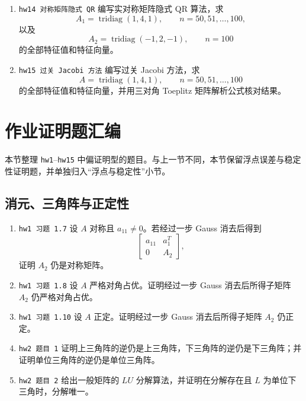 \documentclass{article}
\newcommand{\tridiag}{\operatorname{tridiag}}
\begin{document}
\begin{enumerate}
  \item \texttt{hw14 对称矩阵隐式 QR} 编写实对称矩阵隐式 QR 算法，求
  \[
    A_1=\tridiag(1,4,1),\qquad n=50,51,\ldots,100,
  \]
  以及
  \[
    A_2=\tridiag(-1,2,-1),\qquad n=100
  \]
  的全部特征值和特征向量。

  \item \texttt{hw15 过关 Jacobi 方法} 编写过关 Jacobi 方法，求
  \[
    A=\tridiag(1,4,1),\qquad n=50,51,\ldots,100
  \]
  的全部特征值和特征向量，并用三对角 Toeplitz 矩阵解析公式核对结果。
\end{enumerate}

\section{作业证明题汇编}

\noindent 本节整理 \texttt{hw1}--\texttt{hw15} 中偏证明型的题目。与上一节不同，本节保留浮点误差与稳定性证明题，并单独归入“浮点与稳定性”小节。

\subsection{消元、三角阵与正定性}

\begin{enumerate}
  \item \texttt{hw1 习题 1.7} 设 $A$ 对称且 $a_{11}\ne0$。若经过一步 Gauss 消去后得到
  \[
    \begin{bmatrix}
      a_{11}&a_1^T\\
      0&A_2
    \end{bmatrix},
  \]
  证明 $A_2$ 仍是对称矩阵。

  \item \texttt{hw1 习题 1.8} 设 $A$ 严格对角占优。证明经过一步 Gauss 消去后所得子矩阵 $A_2$ 仍严格对角占优。

  \item \texttt{hw1 习题 1.10} 设 $A$ 正定。证明经过一步 Gauss 消去后所得子矩阵 $A_2$ 仍正定。

  \item \texttt{hw2 题目 1} 证明上三角阵的逆仍是上三角阵，下三角阵的逆仍是下三角阵；并证明单位三角阵的逆仍是单位三角阵。

  \item \texttt{hw2 题目 2} 给出一般矩阵的 $LU$ 分解算法，并证明在分解存在且 $L$ 为单位下三角时，分解唯一。
\end{enumerate}
\end{document}
